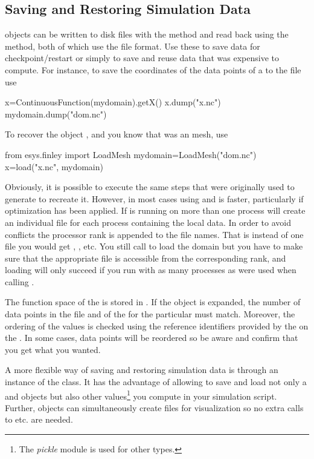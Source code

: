\subsection{Saving and Restoring Simulation Data}
\Data objects can be written to disk files with the  method and
read back using the  method, both of which use the
\netCDF\cite{NETCDF} file format.
Use these to save data for checkpoint/restart or simply to save and reuse data
that was expensive to compute.
For instance, to save the coordinates of the data points of a
\ContinuousFunction to the file  use
\begin{python}
  x=ContinuousFunction(mydomain).getX()
  x.dump("x.nc")
  mydomain.dump("dom.nc")
\end{python}
To recover the object , and you know that  was an \finley
mesh, use
\begin{python}
  from esys.finley import LoadMesh
  mydomain=LoadMesh("dom.nc")
  x=load("x.nc", mydomain)
\end{python}
Obviously, it is possible to execute the same steps that were originally used
to generate  to recreate it. However, in most cases using
 and  is faster, particularly if optimization has
been applied.
If \escript is running on more than one \MPI process  will create
an individual file for each process containing the local data.
In order to avoid conflicts the \MPI processor
rank is appended to the file names.
That is instead of one file  you would get
, , etc.
You still call  to load the domain but you have to
make sure that the appropriate file is accessible from the corresponding rank,
and loading will only succeed if you run with as many processes as were used
when calling .

The function space of the \Data is stored in .
If the \Data object is expanded, the number of data points in the file and of
the \Domain for the particular \FunctionSpace must match.
Moreover, the ordering of the values is checked using the reference
identifiers provided by the \FunctionSpace on the \Domain.
In some cases, data points will be reordered so be aware and confirm that you
get what you wanted.

A more flexible way of saving and restoring \escript simulation data
is through an instance of the  class.
It has the advantage of allowing to save and load not only a \Domain and
\Data objects but also other values\footnote{The \PYTHON \emph{pickle} module
is used for other types.} you compute in your simulation script.
Further,  objects can simultaneously create files for
visualization so no extra calls to  etc. are needed.

